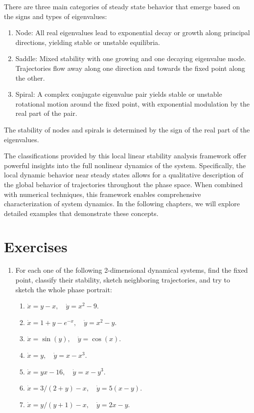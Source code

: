 There are three main categories of steady state behavior that emerge based on the signs and types of eigenvalues:
\begin{enumerate}
\item Node: All real eigenvalues lead to exponential decay or growth along principal directions, yielding stable or unstable equilibria.

\item Saddle: Mixed stability with one growing and one decaying eigenvalue mode. Trajectories flow away along one direction and towards the fixed point along the other.

\item Spiral: A complex conjugate eigenvalue pair yields stable or unstable rotational motion around the fixed point, with exponential modulation by the real part of the pair.
\end{enumerate}
The stability of nodes and spirals is determined by the sign of the real part of the eigenvalues.

The classifications provided by this local linear stability analysis framework offer powerful insights into the full nonlinear dynamics of the system. Specifically, the local dynamic behavior near steady states allows for a qualitative description of the global behavior of trajectories throughout the phase space. When combined with numerical techniques, this framework enables comprehensive characterization of system dynamics. In the following chapters, we will explore detailed examples that demonstrate these concepts.

\section*{Exercises}

\begin{enumerate}
    \item For each one of the following 2-dimensional dynamical systems, find the fixed point, classify their stability, sketch neighboring trajectories, and try to sketch the whole phase portrait:
    \begin{enumerate}
      \item $\dot{x} = y - x, \quad \dot{y} = x^2 -9.$
      \item $\dot{x} = 1+y - e^{-x}, \quad \dot{y} = x^2 -y.$
      \item $\dot{x} = \sin(y), \quad \dot{y} = \cos(x).$
      \item $\dot{x} = y, \quad \dot{y} = x - x^3.$
      \item $\dot{x} = yx-16, \quad \dot{y} = x-y^3.$
      \item $\dot{x} = 3/(2+y) - x, \quad \dot{y} = 5(x-y).$
      \item $\dot{x} = y/(y+1) - x, \quad \dot{y} = 2x - y.$
    \end{enumerate}
\end{enumerate}
  